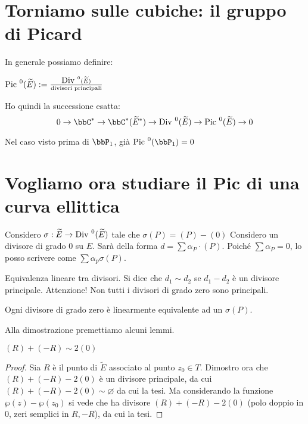 \section{Torniamo sulle cubiche: il gruppo di Picard}
In generale possiamo definire:

\begin{definizione}
$\mbox{Pic }^0(\widetilde{E}) := \frac{\mbox{Div }^0(\widetilde{E})}{\text{divisori principali}}$
\end{definizione}

\begin{osservazione}
Ho quindi la successione esatta:
$$0 \rightarrow \bbC^* \rightarrow \bbC^*(\widetilde{E}^*) \rightarrow \Div^0(\widetilde{E})\rightarrow \Pic^0(\widetilde{E})\rightarrow 0$$
\end{osservazione}

Nel caso visto prima di $\bbP_1$, già $\Pic^0(\bbP_1)=0$


\section{Vogliamo ora studiare il Pic di una curva ellittica}

Considero $\sigma : \widetilde E \rightarrow \mbox{Div }^0(\widetilde E)$ tale che $\sigma(P)=(P)-(0)$
Considero un divisore di grado $0$ su $E$. Sarà della forma $d = \sum\alpha_P\cdot(P)$.
Poiché $\sum \alpha_P=0$, lo posso scrivere come $\sum\alpha_p \sigma(P)$.

\begin{definizione}
Equivalenza lineare tra divisori. Si dice che $d_1 \sim d_2$ se $d_1-d_2$ è un divisore principale. Attenzione! Non tutti i divisori di grado zero sono principali.
\end{definizione}

\begin{teorema}
Ogni divisore di grado zero è linearmente equivalente ad un $\sigma(P)$.
\end{teorema}

Alla dimostrazione premettiamo alcuni lemmi. 
\begin{lemma}
$(R) + (-R) \sim 2(0)$
\end{lemma}
\begin{proof}
Sia $R$ è il punto di $\widetilde E$ associato al punto $z_0 \in T$.
Dimostro ora che $(R)+(-R)-2(0)$ è un divisore principale, da cui $(R)+(-R)-2(0) \sim \varnothing$ da cui la tesi.
Ma considerando la funzione $\wp(z)-\wp(z_0)$ si vede che ha divisore $(R)+(-R)-2(0)$ (polo doppio in $0$, zeri semplici in $R,-R$), da cui la tesi.
\end{proof}



